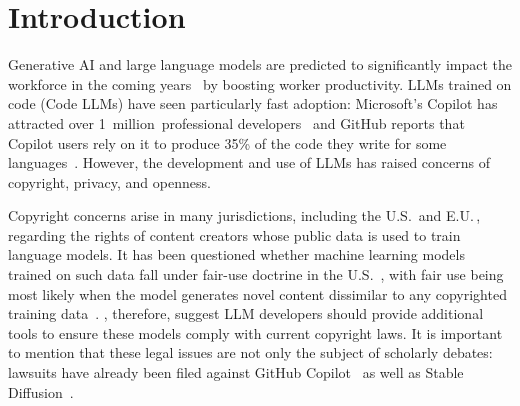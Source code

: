 \documentclass[10pt]{article} %
\begin{document}
\section{Introduction}
\vspace{-0.1cm}
Generative AI and large language models \citep[LLMs;][]{brown2020language, chen2021codex,chowdhery2022palm,zhang2022opt,openai2023gpt4} are predicted to significantly impact the workforce in the coming years~\citep{eloundou2023gpts, stanford2022foundation,wef2023futureofjobs} by boosting worker productivity.  
LLMs trained on code (Code LLMs) have seen particularly fast adoption: Microsoft’s Copilot has attracted over 1~million~professional developers~\citep{euronews2023copilot}
and GitHub reports that Copilot users rely on it to produce 35\% of the code they write for some languages~\citep{thompson-2022-copilot-stats}.
However, the development and use of LLMs has raised concerns of copyright, privacy, and openness.

Copyright concerns arise in many jurisdictions, including the U.S.\ and E.U.\,, regarding the rights of content creators whose public data is used to train language models. %
It has been questioned whether machine learning models trained on such data fall under fair-use doctrine in the U.S.~\citep{kuhn2022copilot,butterick2022copilot,rothchild2022copyright}, with fair use being most likely when the model generates novel content dissimilar to any copyrighted training data~\citep{lemley2020fair,levendowski2018copyright}. 
\citet{henderson2023foundation}, therefore, suggest LLM developers should provide additional tools to ensure these models comply with current copyright laws. It is important to mention that these legal issues are not only the subject of scholarly debates: lawsuits have already been filed against GitHub Copilot~\citep{DOE1vGitHub} as well as Stable Diffusion~\citep{stablediffusion_lawsuit}.%
\end{document}
